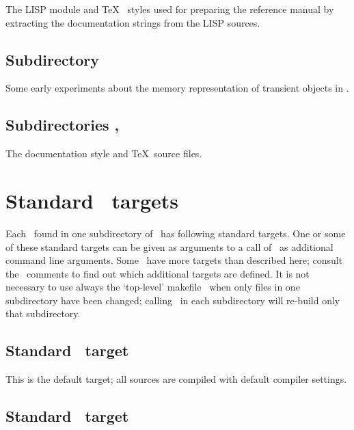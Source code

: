 The LISP module and %
\TeX\ %
styles used for preparing the reference
manual \cite{bib:PLOB-manual} by extracting the documentation strings from
the LISP sources.

\subsection*{Subdirectory
  \protect{}}

Some early experiments about the memory representation of transient
objects in \lw.

\subsection*{Subdirectories
  \protect{},
  \protect{}}

The documentation style and \TeX\ source files.

\section[Make targets]%
{Standard \protect{}\ targets}

Each \ found in one subdirectory of
\ has following standard targets. One or some
of these standard targets can be given as arguments to a call of
\ as additional command line arguments.  Some
\ have more targets than described here; consult the
\ comments to find out which additional targets are
defined.  It is not necessary to use always the `top-level' makefile
\ when only files in one
subdirectory have been changed; calling \ in each
subdirectory will re-build only that subdirectory.

\subsection*{Standard \protect{}\ target \protect{}}

This is the default target; all sources are compiled with default
compiler settings.

\subsection*{Standard \protect{}\ target \protect{}}


